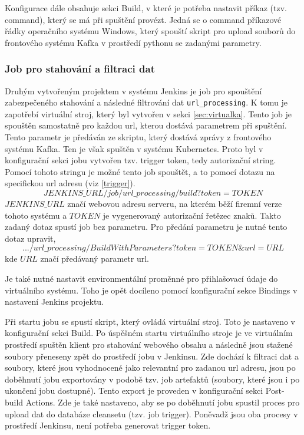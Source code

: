 \documentclass[thesis=M,czech,hidelinks]{FITthesis}[2013/05/06]
\begin{document}
Konfigurace dále obsahuje sekci Build, v které je potřeba nastavit příkaz (tzv. command), který se má při spuštění provézt. Jedná se o command příkazové řádky operačního systému Windows, který spouští skript pro upload souborů do frontového systému Kafka v prostředí pythonu se zadanými parametry.



\subsubsection{Job pro stahování a filtraci dat} \label{sec:jenkinsvirt}
Druhým vytvořeným projektem v systému Jenkins je job pro spouštění zabezpečeného stahování a následné filtrování dat \texttt{url_processing}. K tomu je zapotřebí virtuální stroj, který byl vytvořen v sekci \ref{sec:virtualka}. Tento job je spouštěn samostatně pro každou url, kterou dostává parametrem při spuštění. Tento parametr je předáván ze skriptu, který dostává zprávy z frontového systému Kafka. Ten je však spuštěn v systému Kubernetes. Proto byl v konfigurační sekci jobu vytvořen tzv. trigger token, tedy autorizační string. Pomocí tohoto stringu je možné tento job spouštět, a to pomocí dotazu na specifickou url adresu (viz \ref{trigger}).
\begin{equation} \label{trigger}
JENKINS\_URL/job/url\_processing/build?token=TOKEN
\end{equation}
$JENKINS\_URL$ značí webovou adresu serveru, na kterém běží firemní verze tohoto systému a $TOKEN$ je vygenerovaný autorizační řetězec znaků. Takto zadaný dotaz spustí job bez parametru. Pro předání parametru je nutné tento dotaz upravit,
\begin{equation}
.../url\_processing/BuildWithParameters?token=TOKEN\&url=URL
\end{equation}
kde $URL$ značí předávaný parametr url.

Je také nutné nastavit environmentální proměnné pro přihlašovací údaje do virtuálního systému. Toho je opět docíleno pomocí konfigurační sekce Bindings v nastavení Jenkins projektu. 

Při startu jobu se spustí skript, který ovládá virtuální stroj. Toto je nastaveno v konfigurační sekci Build. Po úspěšném startu virtuálního stroje je ve virtuálním prostředí spuštěn klient pro stahování webového obsahu a následně jsou stažené soubory přeneseny zpět do prostředí jobu v Jenkinsu. Zde dochází k filtraci dat a soubory, které jsou vyhodnocené jako relevantní pro zadanou url adresu, jsou po doběhnutí jobu exportovány v podobě tzv. job artefaktů (soubory, které jsou i po ukončení jobu dostupné). Tento export je proveden v konfigurační sekci Post-build Actions. Zde je také nastaveno, aby se po doběhnutí jobu spustil proces pro upload dat do databáze cleansetu (tzv. job trigger). Poněvadž jsou oba procesy v prostředí Jenkinsu, není potřeba generovat trigger token.
\end{document}
